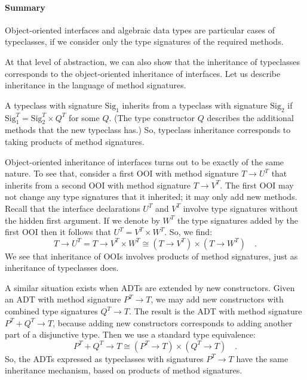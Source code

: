 \paragraph{Summary}

Object-oriented interfaces and algebraic data types are particular
cases of typeclasses, if we consider only the type signatures of the
required methods.

At that level of abstraction, we can also show that the inheritance
of typeclasses corresponds to the object-oriented inheritance of interfaces.
Let us describe inheritance in the language of method signatures. 

A typeclass with signature $\text{Sig}_{1}$ inherits from a typeclass
with signature $\text{Sig}_{2}$ if $\text{Sig}_{1}^{T}=\text{Sig}_{2}^{T}\times Q^{T}$
for some $Q$. (The type constructor $Q$ describes the additional
methods that the new typeclass has.) So, typeclass inheritance corresponds
to taking products of method signatures. 

Object-oriented inheritance of interfaces turns out to be exactly
of the same nature. To see that, consider a first OOI with method
signature $T\rightarrow U^{T}$ that inherits from a second OOI with
method signature $T\rightarrow V^{T}$. The first OOI may not change
any type signatures that it inherited; it may only add new methods.
Recall that the interface declarations $U^{T}$ and $V^{T}$ involve
type signatures without the hidden first argument. If we denote by
$W^{T}$ the type signatures added by the first OOI then it follows
that $U^{T}=V^{T}\times W^{T}$. So, we find:
\[
T\rightarrow U^{T}=T\rightarrow V^{T}\times W^{T}\cong(T\rightarrow V^{T})\times(T\rightarrow W^{T})\quad.
\]
We see that inheritance of OOIs involves products of method signatures,
just as inheritance of typeclasses does.

A similar situation exists when ADTs are extended by new constructors.
Given an ADT with method signature $P^{T}\rightarrow T$, we may add
new constructors with combined type signatures $Q^{T}\rightarrow T$.
The result is the ADT with method signature $P^{T}+Q^{T}\rightarrow T$,
because adding new constructors corresponds to adding another part
of a disjunctive type. Then we use a standard type equivalence:
\[
P^{T}+Q^{T}\rightarrow T\cong(P^{T}\rightarrow T)\times(Q^{T}\rightarrow T)\quad.
\]
So, the ADTs expressed as typeclasses with signatures $P^{T}\rightarrow T$
have the same inheritance mechanism, based on products of method signatures.

